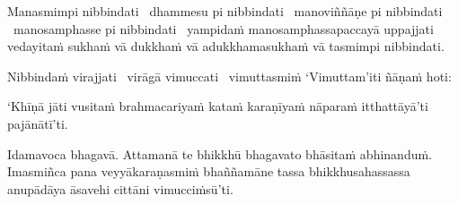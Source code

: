 \begin{pali-hang}
  Manasmimpi nibbindati \breathmark\ dhammesu pi nibbindati \breathmark\ manoviññāṇe pi nibbindati \breathmark\ manosamphasse pi nibbindati \breathmark\ yampidaṁ manosamphassapaccayā uppajjati vedayitaṁ sukhaṁ vā dukkhaṁ vā adukkhamasukhaṁ vā tasmimpi nibbindati.
\end{pali-hang}

\begin{pali-hang}
  Nibbindaṁ virajjati \breathmark\ virāgā vimuccati \breathmark\ vimuttasmiṁ `Vimuttam'iti ñāṇaṁ hoti:
\end{pali-hang}

\begin{pali-hang}
  `Khīṇā jāti vusitaṁ brahmacariyaṁ kataṁ karaṇīyaṁ nāparaṁ itthattāyā'ti pajānātī'ti.
\end{pali-hang}

\begin{pali-hang}
  Idamavoca bhagavā. Attamanā te bhikkhū bhagavato bhāsitaṁ abhinanduṁ. Imasmiñca pana veyyākaraṇasmiṁ bhaññamāne tassa bhikkhusahassassa anupādāya āsavehi cittāni vimucciṁsū'ti.
\end{pali-hang}

\suttaRef{[SN 35.28]}

